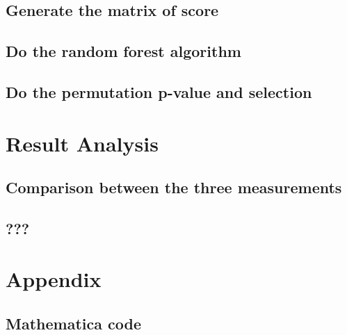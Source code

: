\documentclass{scrartcl}
\begin{document}
\subsection{Generate the matrix of score}


\subsection{Do the random forest algorithm}


\subsection{Do the permutation p-value and selection}


\section{Result Analysis}

\subsection{Comparison between the three measurements}


\subsection{???}


\section{Appendix}

\subsection{Mathematica code}

\end{document}
